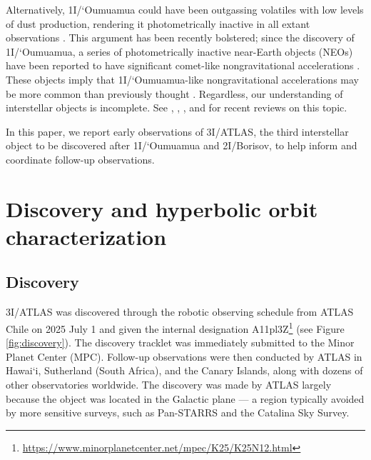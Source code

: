 \documentclass[twocolumn,longbib]{aastex7}
\begin{document}
\begin{CJK*}{UTF8}{gbsn}
Alternatively, 1I/`Oumuamua could have been outgassing volatiles with low levels of dust production, rendering it photometrically inactive in all extant observations \citep{Micheli2018,Sekanina2019,Seligman2020,Levine2021,Levine2021_h2,desch20211i,jackson20211i,Desch2022,Bergner2023}. This argument has been recently bolstered; since the discovery of 1I/`Oumuamua, a series of photometrically inactive near-Earth objects (NEOs) have been reported to have significant comet-like nongravitational accelerations \citep{Farnocchia2023,Seligman2023b,Seligman2024PNAS}. These objects imply that 1I/`Oumuamua-like nongravitational accelerations may be more common than previously thought \citep{Taylor2024}. Regardless, our understanding of interstellar objects is incomplete. See \citet{Fitzsimmons2024}, \citet{Seligman2023}, \citet{Jewitt2023ARAA}, and \citet{MoroMartin2022} for recent reviews on this topic.


In this paper, we report early observations of 3I/ATLAS, the third interstellar object to be discovered after 1I/`Oumuamua and 2I/Borisov,  to help inform and coordinate follow-up observations.

\section{Discovery and hyperbolic orbit characterization}\label{sec:orbit}

\subsection{Discovery}


3I/ATLAS was discovered through the robotic observing schedule from ATLAS Chile \citep{Tonry2018a} on 2025 July 1 and given the internal designation A11pl3Z\footnote{\url{https://www.minorplanetcenter.net/mpec/K25/K25N12.html}} (see Figure \ref{fig:discovery}). The discovery tracklet was immediately submitted to the Minor Planet Center (MPC). Follow-up observations were then conducted by ATLAS in Hawai`i, Sutherland (South Africa), and the Canary Islands, along with dozens of other observatories worldwide.
The discovery was made by ATLAS largely because the object was located in the Galactic plane --- a region typically avoided by more sensitive surveys, such as Pan-STARRS and the Catalina Sky Survey.


\end{CJK*}
\end{document}
